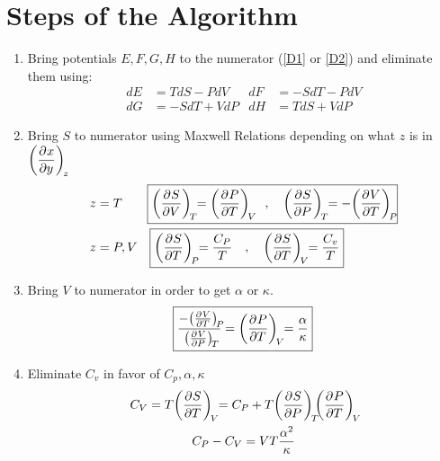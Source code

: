 \documentclass{article}
\begin{document}
\section*{Steps of the Algorithm}
    \begin{enumerate}
        \item Bring potentials $E,F,G,H$ to the numerator (\ref{D1} or \ref{D2}) and eliminate them using:
        \begin{align*}
            dE&=TdS-PdV
            &
            dF&=-SdT-PdV
            \\
            dG&=-SdT+VdP
            &
            dH&=TdS+VdP
        \end{align*}
        \item Bring $S$ to numerator using Maxwell Relations depending on what $z$ is in $\displaystyle\pder{x}{y}[z]$
        \begin{align*}
            z&=T\qquad\boxed{\pder{S}{V}[T]=\pder{P}{T}[V]\quad,\quad \pder{S}{P}[T]=-\pder{V}{T}[P]}
            \\
            z&=P,V\quad\boxed{\pder{S}{T}[P]=\frac{C_P}{T}\quad,\quad \pder{S}{T}[V]=\frac{C_v}{T}}
        \end{align*}
        \item Bring $V$ to numerator in order to get $\alpha$ or $\kappa$. 
        \begin{align*}
            \boxed{\frac{-\pder{V}{T}[P]}{\pder{V}{P}[T]}=\pder{P}{T}[V]=\frac{\alpha}{\kappa}}
        \end{align*}
        \item Eliminate $C_v$ in favor of $C_p,\alpha,\kappa$
        \begin{gather*}
            C_V=T\pder{S}{T}[V]=C_P+T\pder{S}{P}[T]\pder{P}{T}[V]
            \\
            C_P-C_V=VT\frac{\alpha^2}{\kappa}
        \end{gather*}
    \end{enumerate} 
\end{document}
